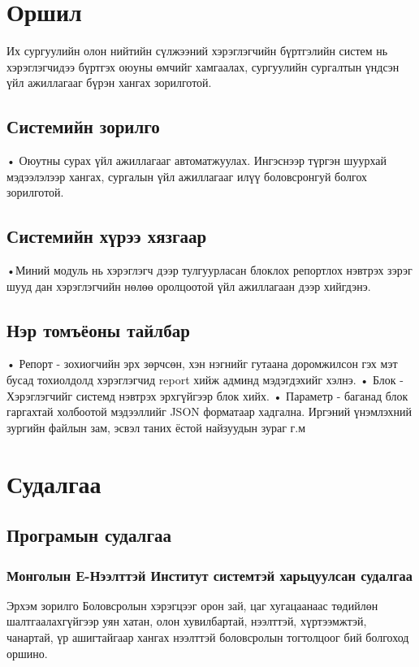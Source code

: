 \documentclass[
oneside, %
english, %
onehalfspacing, %
nolistspacing, %
headsepline, %
]{article} %
\begin{document}

	
	
    \tableofcontents
   
	\section{Оршил}
	   
	   Их сургуулийн олон нийтийн сүлжээний хэрэглэгчийн бүртгэлийн систем нь хэрэглэгчидээ бүртгэх оюуны өмчийг хамгаалах, сургуулийн сургалтын үндсэн үйл ажиллагааг бүрэн хангах зорилготой.
	   
	\subsection{Системийн зорилго}
	• Оюутны сурах үйл ажиллагааг автоматжуулах. Ингэснээр түргэн шуурхай мэдээлэлээр хангах, сургалын үйл ажиллагааг илүү боловсронгуй болгох зорилготой.
	\subsection{Системийн хүрээ хязгаар}
	•Миний модуль нь хэрэглэгч дээр тулгуурласан блоклох репортлох нэвтрэх зэрэг шууд дан хэрэглэгчийн нөлөө оролцоотой үйл ажиллагаан дээр хийгдэнэ.
	\subsection{Нэр томъёоны тайлбар}
	• Репорт - зохиогчийн эрх зөрчсөн, хэн нэгнийг гутаана доромжилсон гэх мэт бусад тохиолдолд хэрэглэгчид report хийж админд мэдэгдэхийг хэлнэ.
	• Блок - Хэрэглэгчийг системд нэвтрэх эрхгүйгээр блок хийх.
	• Параметр - баганад блок гаргахтай холбоотой мэдээллийг 
	JSON форматаар хадгална. Иргэний үнэмлэхний зургийн 
	файлын зам, эсвэл таних ёстой найзуудын зураг г.м
	\section{Судалгаа}
	\subsection{Програмын судалгаа}
	\subsubsection{Монголын Е-Нээлттэй Институт системтэй харьцуулсан судалгаа}
	 
    Эрхэм зорилго
        Боловсролын хэрэгцээг орон зай, цаг хугацаанаас төдийлөн шалтгаалахгүйгээр уян хатан, олон хувилбартай, нээлттэй, хүртээмжтэй, чанартай, үр ашигтайгаар хангах нээлттэй боловсролын тогтолцоог бий болгоход оршино.
        
\end{document}
